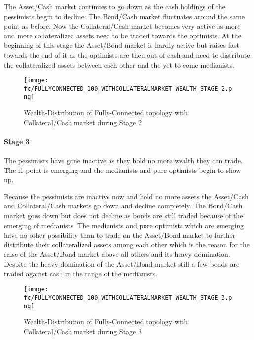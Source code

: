 \documentclass[Bachelorarbeit.tex]{subfiles}
\begin{document}
\medskip

The Asset/Cash market continues to go down as the cash holdings of the pessimists begin to decline. The Bond/Cash market fluctuates around the same point as before. Now the Collateral/Cash market becomes very active as more and more collateralized assets need to be traded towards the optimists.
At the beginning of this stage the Asset/Bond market is hardly active but raises fast towards the end of it as the optimists are then out of cash and need to distribute the collateralized assets between each other and the yet to come medianists.

\begin{figure}[H]
	\centering
  \texttt{[image: fc/FULLYCONNECTED\_100\_WITHCOLLATERALMARKET\_WEALTH\_STAGE\_2.png]}
  	\caption{Wealth-Distribution of Fully-Connected topology with Collateral/Cash market during Stage 2}
	\label{fig:markets_FULLYCONNECTED_100_WITHCOLLATERALMARKET_WEALTH_STAGE_2}
\end{figure}

\paragraph{Stage 3}
The pessimists have gone inactive as they hold no more wealth they can trade. The i1-point is emerging and the medianists and pure optimists begin to show up.

\medskip

Because the pessimists are inactive now and hold no more assets the Asset/Cash and Collateral/Cash markets go down and decline completely. The Bond/Cash market goes down but does not decline as bonds are still traded because of the emerging of medianists. The medianists and pure optimists which are emerging have no other possibility than to trade on the Asset/Bond market to further distribute their collateralized assets among each other which is the reason for the raise of the Asset/Bond market above all others and its heavy domination. Despite the heavy domination of the Asset/Bond market still a few bonds are traded against cash in the range of the medianists.

\begin{figure}[H]
	\centering
  \texttt{[image: fc/FULLYCONNECTED\_100\_WITHCOLLATERALMARKET\_WEALTH\_STAGE\_3.png]}
  	\caption{Wealth-Distribution of Fully-Connected topology with Collateral/Cash market during Stage 3}
	\label{fig:markets_FULLYCONNECTED_100_WITHCOLLATERALMARKET_WEALTH_STAGE_3}
\end{figure}
\end{document}
